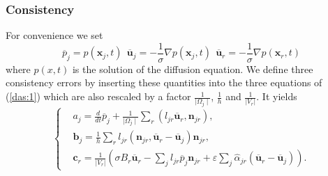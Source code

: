 \documentclass[a4paper,french,english,10pt]{article}
\newcommand\ljr{l_{jr}}
\newcommand\njr{\mathbf{n}_{jr}}
\newcommand\uu{\mathbf{u}}
\newcommand\eps{\varepsilon}
\newcommand\alj{\widehat{\alpha}_{jr}}
\newcommand\x{\mathbf{x}}
\newcommand\pej{\overline{p}_j}
\newcommand\uej{\overline{\uu}_j}
\newcommand\uer{\overline{\uu}_r}
\newcommand\cc{\mathbf{c}}
\newcommand\bb{\mathbf{b}}
\newcommand\ccr{\cc_r}
\newcommand\bj{\bb_j}
\begin{document}
\subsubsection{Consistency}

For convenience   we set
\begin{equation} \label{eq:con1}
\pej=p(\x_j,t)\ \ \uej=-\frac{1}{\sigma}\nabla p(\x_j,t)\ \
\uer=-\frac{1}{\sigma}\nabla p(\x_r,t)
\end{equation}
where $p(x,t)$ is the solution of the diffusion equation. 
 We define three consistency errors 
by inserting these quantities into the three equations of
(\ref{das:1}) which are also rescaled by a factor $\frac1{\mid\Omega_{j}\mid}$, $\frac 1 h $ and $\frac{1}{\vert V_r\vert}$.
It yields 
\begin{equation*} \label{eq:d2.2}
\left\{ 
\begin{aligned}
&a_j=\displaystyle \frac{d}{dt} \pej+
\frac{1}{\mid\Omega_{j}\mid}\sum_{r}(l_{jr}\uer,\njr), \\
&\bj= \frac{1}{h}\sum_{r}l_{jr} (\njr,\uer -\uej)\njr , \\
& \ccr=\frac{1}{\vert V_r\vert}\left (   \sigma B_r \uer- \sum_{j}\ljr
\pej\njr+ \eps\sum_j\alj(\uer-\uej)\right ).
\end{aligned}
\right.
\end{equation*}
\end{document}
